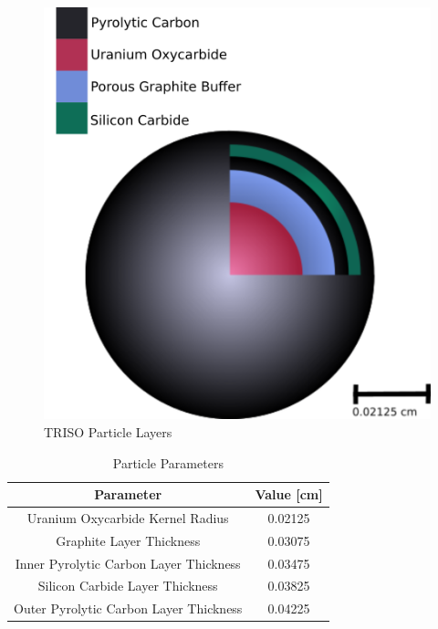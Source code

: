 
\begin{figure}[H]
\centering

\includegraphics[width=0.5\linewidth]{figures/trisos-r-like-onions.png}
\caption{TRISO Particle Layers}
\label{fig:particle-layer}
\end{figure}

\begin{table}[h!]
\centering

\caption{Particle Parameters}
\begin{tabular}{ c  c }
\hline
Parameter & Value [cm] \\
\hline 
Uranium Oxycarbide Kernel Radius & 0.02125 \\
Graphite Layer Thickness & 0.03075 \\
Inner Pyrolytic Carbon Layer Thickness & 0.03475 \\
Silicon Carbide Layer Thickness & 0.03825 \\
Outer Pyrolytic Carbon Layer Thickness & 0.04225 \\
\hline
\end{tabular}
\label{table:particle-params}

\end{table}

